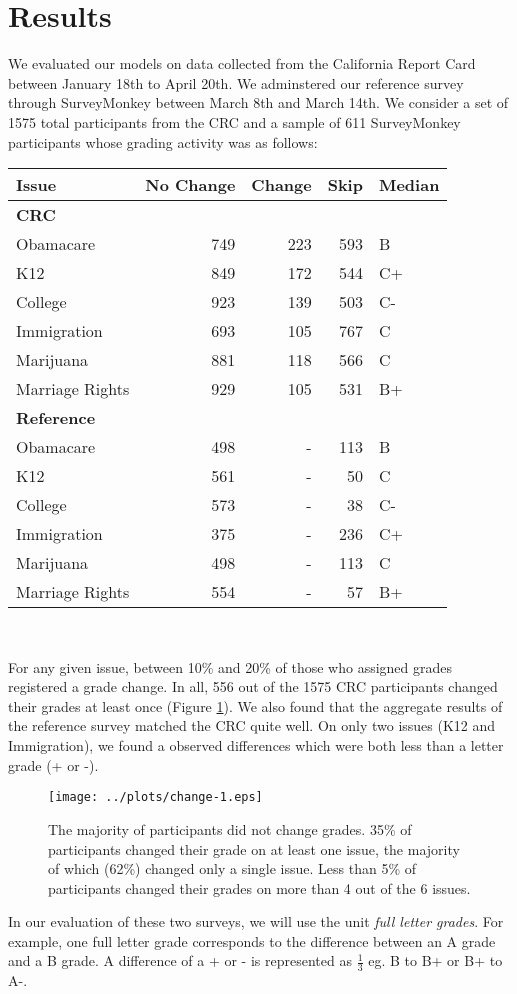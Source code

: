 \section{Results}
We evaluated our models on data collected from the California Report Card between January 18th to April 20th.
We adminstered our reference survey through SurveyMonkey between March 8th and March 14th.
We consider a set of 1575 total participants from the CRC and a sample of 611 SurveyMonkey participants whose grading activity was as follows:\\[1\baselineskip]

{\centering\scriptsize
\begin{tabular}[!ht]{ l | r | r | r | l }
Issue & No Change & Change & Skip & Median \\
\hline
\hline
  \multicolumn{5}{l}{\textbf{CRC}}\\
  \hline
  Obamacare & 749 & 223 & 593 & B \\
  \hline
  K12 & 849 & 172 & 544 & C+ \\
  \hline
  College & 923 & 139 & 503 & C-\\
  \hline
  Immigration & 693 & 105 & 767 & C \\
  \hline
  Marijuana & 881 & 118 & 566 & C \\
  \hline
  Marriage Rights & 929 & 105 & 531 & B+\\
\hline
\hline
\multicolumn{5}{l}{\textbf{Reference}}\\
\hline
  Obamacare & 498 & - & 113 & B \\
  \hline
  K12 & 561 & - & 50 & C \\
  \hline
  College & 573 & - & 38 & C-\\
  \hline
  Immigration & 375 & - & 236 & C+ \\
  \hline
  Marijuana & 498 & - & 113 & C \\
  \hline
  Marriage Rights & 554 & - & 57 & B+
\end{tabular}\\[1\baselineskip]
}

For any given issue, between 10\% and 20\% of those who assigned grades registered a grade change.
In all, 556 out of the 1575 CRC participants changed their grades at least once (Figure \ref{change-1}).
We also found that the aggregate results of the reference survey matched the CRC quite well.
On only two issues (K12 and Immigration), we found a observed differences which were both less than a letter grade (+ or -).
\begin{figure}[h]
\vspace{-1.5em}
  \centering
    \texttt{[image: ../plots/change-1.eps]}
      \caption{The majority of participants did not change grades. 35\% of participants changed their grade on at least one issue, the majority of which (62\%) changed only a single issue. Less than 5\% of participants changed their grades on more than 4 out of the 6 issues.}
      \label{change-1}
\end{figure}
In our evaluation of these two surveys, we will use the unit \emph{full letter grades}.
For example, one full letter grade corresponds to the difference between an A grade and a B grade. 
A difference of a + or - is represented as $\frac{1}{3}$ eg. B to B+ or B+ to A-. 
